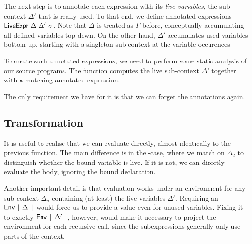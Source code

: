 \documentclass[11pt,a4paper]{article}
\newcommand{\AgdaFloor}[1]{\AgdaFunction{$\lfloor$}\ #1\ \AgdaFunction{$\rfloor$}}
\begin{document}
The next step is to annotate each expression with its \emph{live variables},
the sub-context $\Delta'$ that is really used.
To that end, we define annotated expressions
$\AgdaDatatype{LiveExpr}\ \Delta\ \Delta'\ \sigma$.
Note that $\Delta$ is treated as $\Gamma$ before,
conceptually accumulating all defined variables top-down.
On the other hand, $\Delta'$ accumulates used variables bottom-up,
starting with a singleton sub-context at the variable occurences.

\CodeLiveExpr

To create such annotated expressions, we need to perform
some static analysis of our source programs.
The function  computes the live sub-context $\Delta'$
together with a matching annotated expression.

\CodeLiveAnalyse

The only requirement we have for it is that we can forget the annotations again.

\CodeLiveForgetSignature

\CodeLiveAnalysePreservesSignature


\subsection{Transformation}

It is useful to realise that we can evaluate  directly,
almost identically to the previous  function.
The main difference is in the -case,
where we match on $\Delta_2$ to distinguish whether the bound variable is live.
If it is not, we can directly evaluate the body, ignoring the bound declaration.

Another important detail is that evaluation works under an environment
for any sub-context $\Delta_u$
containing (at least) the live variables $\Delta'$.
Requiring an $\AgdaDatatype{Env}\ \AgdaFloor{\Delta}$ would force us
to provide a value even for unused variables.
Fixing it to exactly $\AgdaDatatype{Env}\ \AgdaFloor{\Delta'}$, however,
would make it necessary to project the environment for each recursive call,
since the subexpressions generally only use parts of the context.
\end{document}
